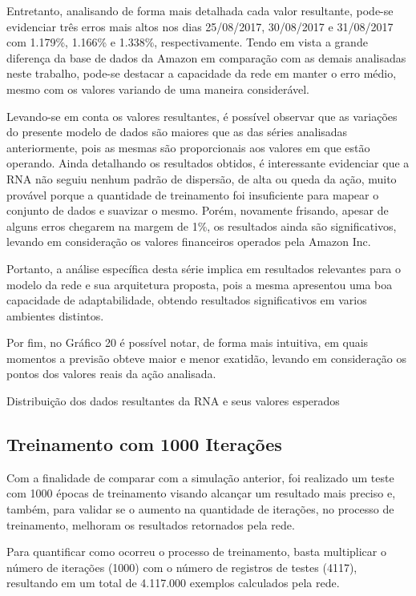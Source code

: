Entretanto, analisando de forma mais detalhada cada valor resultante, pode-se evidenciar três erros mais altos nos dias 25/08/2017, 30/08/2017 e 31/08/2017 com 1.179\%, 1.166\% e 1.338\%, respectivamente. Tendo em vista a grande diferença da base de dados da Amazon em comparação com as demais analisadas neste trabalho, pode-se destacar a capacidade da rede em manter o erro médio, mesmo com os valores variando de uma maneira considerável.

Levando-se em conta os valores resultantes, é possível observar que as variações do presente modelo de dados são maiores que as das séries analisadas anteriormente, pois as mesmas são proporcionais aos valores em que estão operando. Ainda detalhando os resultados obtidos, é interessante evidenciar que a RNA não seguiu nenhum padrão de dispersão, de alta ou queda da ação, muito provável porque a quantidade de treinamento foi insuficiente para mapear o conjunto de dados e suavizar o mesmo. Porém, novamente frisando, apesar de alguns erros chegarem na margem de 1\%, os resultados ainda são significativos, levando em consideração os valores financeiros operados pela Amazon Inc. 

Portanto, a análise específica desta série implica em resultados relevantes para o modelo da rede e sua arquitetura proposta, pois a mesma apresentou uma boa capacidade de adaptabilidade, obtendo resultados significativos em varios ambientes distintos.

Por fim, no Gráfico 20 é possível notar, de forma mais intuitiva, em quais momentos a previsão obteve maior e menor exatidão, levando em consideração os pontos dos valores reais da ação analisada.
\begin{grafico}[h]
	\centering
	\caption{Distribuição dos dados resultantes da RNA e seus valores esperados}
	\label{lingua}
\end{grafico}

\subsection{Treinamento com 1000 Iterações}
Com a finalidade de comparar com a simulação anterior, foi realizado um teste com 1000 épocas de treinamento visando alcançar um resultado mais preciso e, também, para validar se o aumento na quantidade de iterações, no processo de treinamento, melhoram os resultados retornados pela rede.

Para quantificar como ocorreu o processo de treinamento, basta multiplicar o número de iterações (1000) com o número de registros de testes (4117), resultando em um total de 4.117.000 exemplos calculados pela rede.

